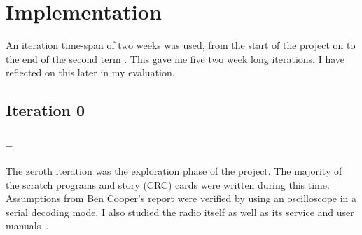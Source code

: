 \chapter{Implementation}





An iteration time-span of two weeks was used, from the start of the project on  to the end of the second term . This gave me five two week long iterations. I have reflected on this later in my evaluation.

\section{Iteration 0}
\subsection*{ -- }

The zeroth iteration was the exploration phase of the project. The majority of the scratch programs and story (CRC) cards were written during this time. Assumptions from Ben Cooper's report\cite{ben_report} were verified by using an oscilloscope in a serial decoding mode. I also studied the radio itself as well as its service and user manuals~\cite{user_manual}. 

